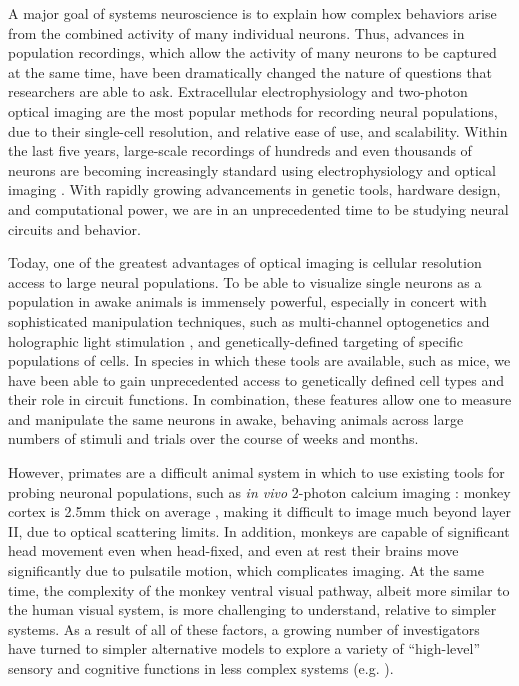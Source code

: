 A major goal of systems neuroscience is to explain how complex behaviors arise from the combined activity of many individual neurons. Thus, advances in population recordings, which allow the activity of many neurons to be captured at the same time, have been dramatically changed the nature of questions that researchers are able to ask. Extracellular electrophysiology and two-photon optical imaging are the most popular methods for recording neural populations, due to their single-cell resolution, and relative ease of use, and scalability. Within the last five years, large-scale recordings of hundreds and even thousands of neurons are becoming increasingly standard using electrophysiology \cite{Steinmetz2019, Siegle2021, Stringer2019SpontaneousActivity} and optical imaging \cite{Stringer2019High-dimensionalCortex, Weisenburger2019, Sofroniew2016}. With rapidly growing advancements in genetic tools, hardware design, and computational power, we are in an unprecedented time to be studying neural circuits and behavior. 

Today, one of the greatest advantages of optical imaging is cellular resolution access to large neural populations. To be able to visualize single neurons as a population in awake animals is immensely powerful, especially in concert with sophisticated manipulation techniques, such as multi-channel optogenetics and holographic light stimulation \cite{Gill2020, Chong2020 Packer2016, Yang2018}, and genetically-defined targeting of specific populations of cells. In species in which these tools are available, such as mice, we have been able to gain unprecedented access to genetically defined cell types and their role in circuit functions\cite{Luo2008, Luo2018, HubermanNiell2011}. In combination, these features allow one to measure and manipulate the same neurons in awake, behaving animals across large numbers of stimuli and trials over the course of weeks and months. 


However, primates are a difficult animal system in which to use existing tools for probing neuronal populations, such as \textit{in vivo} 2-photon calcium imaging \cite{Ohki2005}: monkey cortex is 2.5mm thick on average \cite{Koo2012}, making it difficult to image much beyond layer II, due to optical scattering limits. In addition, monkeys are capable of significant head movement even when head-fixed, and even at rest their brains move significantly due to pulsatile motion, which complicates imaging. At the same time, the complexity of the monkey ventral visual pathway, albeit more similar to the human visual system, is more challenging to understand, relative to simpler systems. As a result of all of these factors, a growing number of investigators have turned to simpler alternative models to explore a variety of ``high-level'' sensory and cognitive functions in less complex systems (e.g. \cite{Brunton2013, Miller2017TwoStep, Aronov2014, Glickfeld2017, HubermanNiell2017}).

